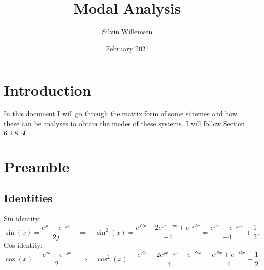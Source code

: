 \documentclass{article}
\title{Modal Analysis}
\author{Silvin Willemsen}
\date{February 2021}
\begin{document}
\maketitle

\section{Introduction}
In this document I will go through the matrix form of some schemes and how these can be analyses to obtain the modes of these systems. I will follow Section 6.2.8 of \cite{Bilbao2009}.

\section{Preamble}
\subsection{Identities}
Sin identity:
\begin{equation}\label{eq:sinIdentity}
    \sin(x) = \frac{e^{jx} - e^{-jx}}{2j}\quad \Longrightarrow \quad \sin^2(x) = \frac{e^{j2x} - 2e^{jx-jx}+ e^{-j2x}}{-4} = \frac{e^{j2x} + e^{-j2x}}{-4} + \frac{1}{2}.
\end{equation}
Cos identity:
\begin{equation}\label{eq:cosIdentity}
    \cos(x) = \frac{e^{jx} + e^{-jx}}{2}\quad \Longrightarrow \quad \cos^2(x) = \frac{e^{j2x} + 2e^{jx-jx}+ e^{-j2x}}{4} = \frac{e^{j2x} + e^{-j2x}}{4} + \frac{1}{2}.
\end{equation}

\end{document}
